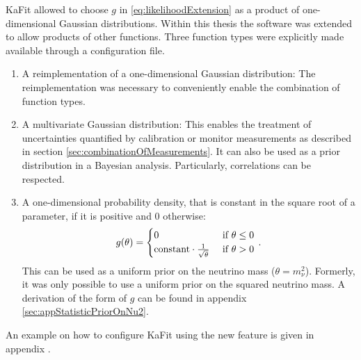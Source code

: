 KaFit allowed to choose $g$ in \ref{eq:likelihoodExtension} as a product of one-dimensional Gaussian distributions. Within this thesis the software was extended to allow products of other functions. Three function types were explicitly made available through a configuration file.
\begin{enumerate}
	\item A reimplementation of a one-dimensional Gaussian distribution: The reimplementation was necessary to conveniently enable the combination of function types.
	\item A multivariate Gaussian distribution: This enables the treatment of uncertainties quantified by calibration or monitor measurements as described in section \ref{sec:combinationOfMeasurements}. It can also be used as a prior distribution in a Bayesian analysis. Particularly, correlations can be respected.
	\item A one-dimensional probability density, that is constant in the square root of a parameter, if it is positive and 0 otherwise:
	\begin{equation}
		g(\theta) =
		\begin{cases}
		0 &\text{ if } \theta \leq 0 \\
		\text{constant} \cdot \frac{1}{\sqrt{\theta}} &\text{ if } \theta > 0
		\end{cases}
		\text{\,.}
	\end{equation}
	 This can be used as a uniform prior on the neutrino mass ($\theta=m_\nu^2$). Formerly, it was only possible to use a uniform prior on the squared neutrino mass. A derivation of the form of $g$ can be found in appendix \ref{sec:appStatisticPriorOnNu2}.
\end{enumerate}
An example on how to configure KaFit using the new feature is given in appendix .
